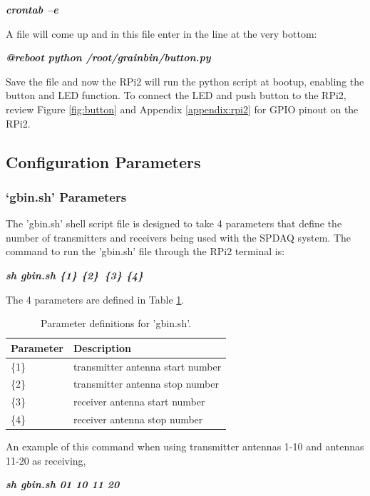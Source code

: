 \textbf{\textit{crontab –e}}

\noindent 
A file will come up and in this file enter in the line at the very bottom:

\textbf{\textit{@reboot python /root/grainbin/button.py}}

\noindent
Save the file and now the RPi2 will run the python script at bootup, enabling the button and LED function. To connect the LED and push button to the RPi2, review Figure \ref{fig:button} and Appendix \ref{appendix:rpi2} for GPIO pinout on the RPi2. 

\subsection{Configuration Parameters}

\subsubsection{‘gbin.sh’ Parameters}

The 'gbin.sh' shell script file is designed to take 4 parameters that define the number of transmitters and receivers being
used with the SPDAQ system.  The command to run the 'gbin.sh' file through the RPi2 terminal is:

\textbf{\textit{sh gbin.sh \{1\} \{2\}\ \{3\} \{4\}}}

\noindent
The 4 parameters are defined in Table \ref{table:gbinsh}.

\begin{table}[h]
\centering \caption{Parameter definitions for 'gbin.sh'.}
\label{table:gbinsh}
\begin{tabular}{|l|l|}
\hline
\textbf{Parameter} 	& \textbf{Description}             \\ \hline
\{1\}              	& transmitter antenna start number \\ \hline
\{2\}				& transmitter antenna stop number  \\ \hline
\{3\}     			& receiver antenna start number    \\ \hline
\{4\}              	& receiver antenna stop number			\\ \hline
\end{tabular}
\end{table}

An example of this command when using transmitter antennas 1-10 and antennas 11-20 as receiving,

\textbf{\textit{sh gbin.sh 01 10 11 20}}

